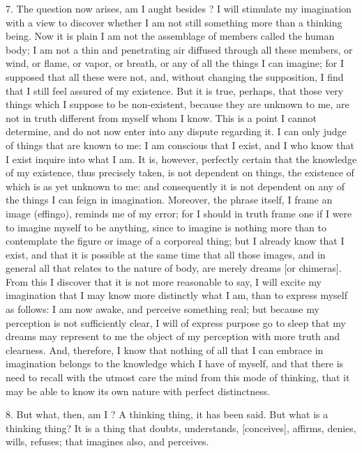 7. The question now arises, am I aught besides ? I will stimulate my imagination with a view to discover whether I am not still something more than a thinking being. Now it is plain I am not the assemblage of members called the human body; I am not a thin and penetrating air diffused through all these members, or wind, or flame, or vapor, or breath, or any of all the things I can imagine; for I supposed that all these were not, and, without changing the supposition, I find that I still feel assured of my existence. But it is true, perhaps, that those very things which I suppose to be non-existent, because they are unknown to me, are not in truth different from myself whom I know. This is a point I cannot determine, and do not now enter into any dispute regarding it. I can only judge of things that are known to me: I am conscious that I exist, and I who know that I exist inquire into what I am. It is, however, perfectly certain that the knowledge of my existence, thus precisely taken, is not dependent on things, the existence of which is as yet unknown to me: and consequently it is not dependent on any of the things I can feign in imagination. Moreover, the phrase itself, I frame an image (effingo), reminds me of my error; for I should in truth frame one if I were to imagine myself to be anything, since to imagine is nothing more than to contemplate the figure or image of a corporeal thing; but I already know that I exist, and that it is possible at the same time that all those images, and in general all that relates to the nature of body, are merely dreams [or chimeras]. From this I discover that it is not more reasonable to say, I will excite my imagination that I may know more distinctly what I am, than to express myself as follows: I am now awake, and perceive something real; but because my perception is not sufficiently clear, I will of express purpose go to sleep that my dreams may represent to me the object of my perception with more truth and clearness. And, therefore, I know that nothing of all that I can embrace in imagination belongs to the knowledge which I have of myself, and that there is need to recall with the utmost care the mind from this mode of thinking, that it may be able to know its own nature with perfect distinctness.

8. But what, then, am I ? A thinking thing, it has been said. But what is a thinking thing? It is a thing that doubts, understands, [conceives], affirms, denies, wills, refuses; that imagines also, and perceives.

